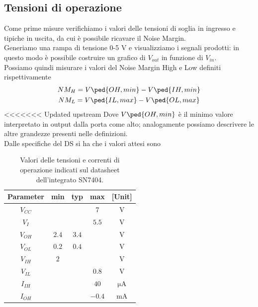 \documentclass[10pt, a4paper, italian]{article}
\begin{document}
\subsection{Tensioni di operazione}
Come prime misure verifichiamo i valori delle tensioni di soglia in ingresso e tipiche in uscita, da cui è possibile ricavare il Noise Margin.\\
Generiamo una rampa di tensione 0-5 V e visualizziamo i segnali prodotti:
in questo modo è possibile costruire un grafico di $V_{out}$ in funzione di $V_{in}$.\\ %
Possiamo quindi misurare i valori del Noise Margin High e Low definiti rispettivamente
\begin{gather*}
    NM_H = V\ped{OH, min} - V\ped{IH, min}\\
    NM_L = V\ped{IL,max} - V\ped{OL, max}
\end{gather*}
<<<<<<< Updated upstream
Dove $V\ped{OH, min}$ è il minimo valore interpretato in output dalla porta come alto; analogamente possiamo descrivere le altre grandezze presenti nelle definizioni.\\
Dalle specifiche del DS si ha che i valori attesi sono %
\begin{table}[htb]
\centering
\begin{tabular}{cccc|c}
\toprule
Parameter  & min & typ & max & [Unit] \\
\midrule
\midrule
$V_{CC}$ &  &  & $7$ & V \\
$V_I$	 &  &  & $5.5$ & V\\
$V_{OH}$ & $2.4$  & $3.4$ & & V \\
$V_{OL}$ & $0.2$  & $0.4$ & & V \\
$V_{IH}$ & $2$  &  & & V  \\
$V_{IL}$ &  &  & $0.8$ & V \\
$I_{IH}$ &  &  & $40$ & $\si{\micro\A}$ \\
$I_{OH}$ &  &  & $-0.4$ & mA \\
\bottomrule 
\end{tabular}

\caption{Valori delle tensioni e correnti di operazione indicati sul
datasheet dell'integrato SN7404.}
\label{tab: notDS}
\end{table}
\end{document}

